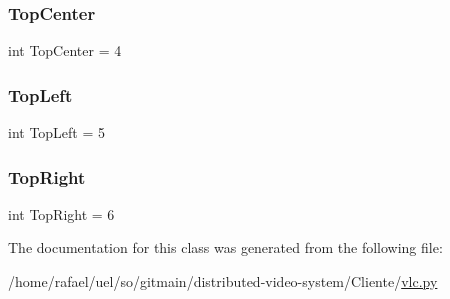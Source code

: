 \subsubsection{\texorpdfstring{Top\+Center}{TopCenter}}
{\footnotesize\ttfamily int Top\+Center = 4\hspace{0.3cm}{\ttfamily [static]}}

\mbox{\label{classvlc_1_1_position_a8bcfa20ce6896edfe82ea54a9066d80e}} 
\subsubsection{\texorpdfstring{Top\+Left}{TopLeft}}
{\footnotesize\ttfamily int Top\+Left = 5\hspace{0.3cm}{\ttfamily [static]}}

\mbox{\label{classvlc_1_1_position_a89cd4d2f7982a85d52f31a6843bf435b}} 
\subsubsection{\texorpdfstring{Top\+Right}{TopRight}}
{\footnotesize\ttfamily int Top\+Right = 6\hspace{0.3cm}{\ttfamily [static]}}



The documentation for this class was generated from the following file\+:\begin{DoxyCompactItemize}
\item 
/home/rafael/uel/so/gitmain/distributed-\/video-\/system/\+Cliente/\hyperlink{vlc_8py}{vlc.\+py}\end{DoxyCompactItemize}
